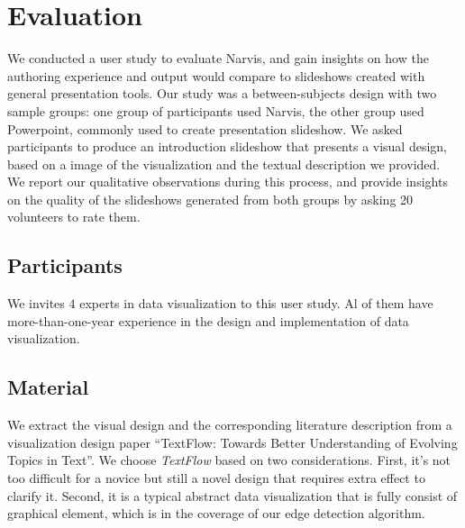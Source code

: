 \section{Evaluation}
We conducted a user study to evaluate Narvis, and gain insights on how the authoring experience and output would compare to slideshows created with general presentation tools. Our study was a between-subjects design with two sample groups: one group of participants used Narvis, the other group used Powerpoint, commonly used to create presentation slideshow. We asked participants to produce an introduction slideshow that presents a visual design, based on a image of the visualization and the textual description we provided. 
We report our qualitative observations during this process, and provide insights on the quality of the slideshows generated from both groups by asking 20 volunteers to rate them.
\subsection{Participants}
We invites 4 experts in data visualization to this user study. Al of them have more-than-one-year experience in the design and implementation of data visualization. 
\subsection{Material}
We extract the visual design and the corresponding literature description from  a visualization design paper ``TextFlow: Towards Better Understanding of Evolving Topics in Text''\cite{cui_textflow:_2011}.
We choose \textit{TextFlow} based on two considerations. First, it's not too difficult for a novice but still a novel design that requires extra effect to clarify it.
Second, it is a typical abstract data visualization that is fully consist of graphical element, which is in the coverage of our edge detection algorithm. 

